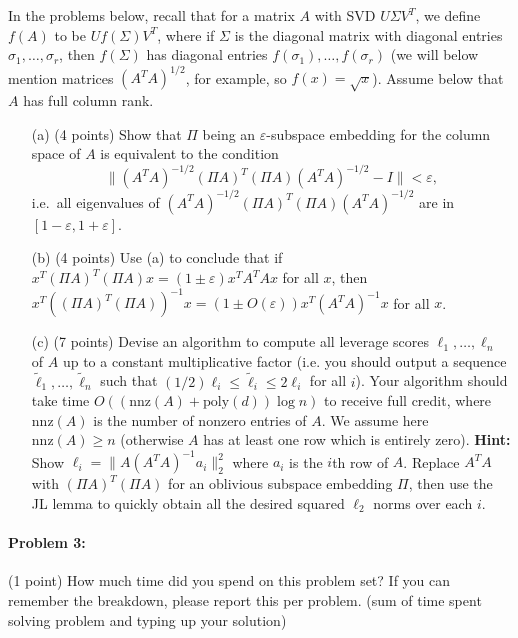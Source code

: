 \documentclass[12pt]{article}
\newcommand{\eps}{\varepsilon}
\begin{document}
In the problems below, recall that for a matrix $A$ with SVD $U\Sigma V^T$, we define $f(A)$ to be $U f(\Sigma) V^T$, where if $\Sigma$ is the diagonal matrix with diagonal entries $\sigma_1,\ldots,\sigma_r$, then $f(\Sigma)$ has diagonal entries $f(\sigma_1),\ldots,f(\sigma_r)$ (we will below mention matrices $(A^T A)^{1/2}$, for example, so $f(x) = \sqrt{x}$).  Assume below that $A$ has full column rank.
\begin{itemize}
\item[(a)] (4 points) Show that $\Pi$ being an $\eps$-subspace embedding for the column space of $A$ is equivalent to the condition
$$
\|(A^T A)^{-1/2} (\Pi A)^T (\Pi A) (A^T A)^{-1/2} - I\| < \eps ,
$$
i.e.\ all eigenvalues of $(A^T A)^{-1/2} (\Pi A)^T (\Pi A) (A^T A)^{-1/2}$ are in $[1-\eps, 1+\eps]$.
\item[(b)] (4 points) Use (a) to conclude that if $x^T(\Pi A)^T (\Pi A) x = (1\pm\eps) x^T A^T A x$ for all $x$, then $x^T ((\Pi A)^T (\Pi A))^{-1} x = (1\pm O(\eps)) x^T (A^T A)^{-1} x$ for all $x$.
\item[(c)] (7 points) Devise an algorithm to compute all leverage scores $\ell_1,\ldots,\ell_n$ of $A$ up to a constant multiplicative factor (i.e. you should output a sequence $\tilde{\ell}_1,\ldots,\tilde{\ell}_n$ such that $(1/2)\ell_i \le \tilde{\ell}_i \le 2\ell_i$ for all $i$). Your algorithm should take time $O((\mathrm{nnz}(A) + \mathrm{poly}(d))\log n)$ to receive full credit, where $\mathrm{nnz}(A)$ is the number of nonzero entries of $A$. We assume here $\mathrm{nnz}(A) \ge n$ (otherwise $A$ has at least one row which is entirely zero). \textbf{Hint:} Show $\ell_i = \|A (A^T A)^{-1} a_i\|_2^2$ where $a_i$ is the $i$th row of $A$. Replace $A^T A$ with $(\Pi A)^T (\Pi A)$ for an oblivious subspace embedding $\Pi$, then use the JL lemma to quickly obtain all the desired squared $\ell_2$ norms over each $i$.
\end{itemize}

\paragraph{Problem 3:} (1 point) How much time did you spend on this problem set? If you can remember the breakdown, please report this per problem. (sum of time spent solving problem and typing up your solution)
\end{document}
